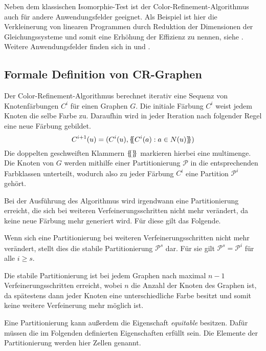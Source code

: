 Neben dem klassischen Isomorphie-Test ist der Color-Refinement-Algorithmus auch für andere Anwendungsfelder geeignet.
Als Beispiel ist hier die Verkleinerung von linearen Programmen durch Reduktion der Dimensionen der Gleichungssysteme und somit eine Erhöhung der Effizienz zu nennen, siehe \cite{Grohe2014}.
Weitere Anwendungsfelder finden sich in \cite{shervashidze2011weisfeiler} und \cite{kersting2014power}.

\subsection{Formale Definition von CR-Graphen}
\label{sec/formal_cr}
Der Color-Refinement-Algorithmus berechnet iterativ eine Sequenz von Knotenfärbungen $C^i$ für einen Graphen $G$.
Die initiale Färbung $C^i$ weist jedem Knoten die selbe Farbe zu.
Daraufhin wird in jeder Iteration nach folgender Regel eine neue Färbung gebildet.
\begin{equation}
C^{i+1}(u)=(C^i(u),\{\mskip-5mu\{ C^i(a):a\in N(u)\}\mskip-5mu\} )
\label{eq:1}
\end{equation}
Die doppelten geschweiften Klammern $\{\mskip-5mu\{ \}\mskip-5mu\} $ markieren hierbei eine \gls{multimenge}.
Die Knoten von $G$ werden mithilfe einer Partitionierung $\mathcal{P}$ in die entsprechenden Farbklassen unterteilt, wodurch also zu jeder Färbung $C^i$ eine Partition $\mathcal{P}^i$ gehört.

Bei der Ausführung des Algorithmus wird irgendwann eine Partitionierung erreicht, die sich bei weiteren Verfeinerungsschritten nicht mehr verändert, da keine neue Färbung mehr generiert wird.
Für diese gilt das Folgende.
\begin{Definition}
	Wenn sich eine Partitionierung bei weiteren Verfeinerungsschritten nicht mehr verändert, stellt dies die stabile Partitionierung $\mathcal{P}^s$ dar.
	Für sie gilt $\mathcal{P}^s=\mathcal{P}^i$ für alle $i\geq s$.
\end{Definition}
Die stabile Partitionierung ist bei jedem Graphen nach maximal $n-1$ Verfeinerungsschritten erreicht, wobei $n$ die Anzahl der Knoten des Graphen ist, da spätestens dann jeder Knoten eine unterschiedliche Farbe besitzt und somit keine weitere Verfeinerung mehr möglich ist.

Eine Partitionierung kann außerdem die Eigenschaft \emph{equitable} besitzen.
Dafür müssen die im Folgenden definierten Eigenschaften erfüllt sein.
Die Elemente der Partitionierung werden hier Zellen genannt.

